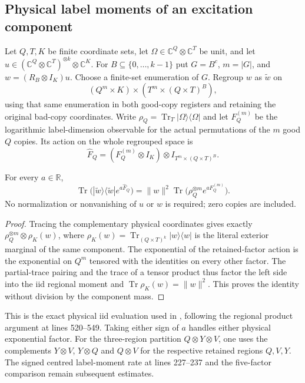 \subsection{Physical label moments of an excitation component}
\label{sec:replica_physical_label_moment}

Let $Q,T,K$ be finite coordinate sets, let $\Omega\in\mathbb C^Q\otimes\mathbb C^T$
be unit, and let $u\in(\mathbb C^Q\otimes\mathbb C^T)^{\otimes k}\otimes\mathbb C^K$.
For $B\subseteq\{0,\ldots,k-1\}$ put $G=B^c$, $m=|G|$, and
$w=(R_B\otimes I_K)u$. Choose a finite-set enumeration of $G$. Regroup $w$ as
$\widetilde w$ on
\[
 (Q^m\times K)\times(T^m\times(Q\times T)^B),
\]
using that same enumeration in both good-copy registers and retaining the
original bad-copy coordinates. Write
$\rho_Q=\operatorname{Tr}_T|\Omega\rangle\langle\Omega|$ and let $F_Q^{(m)}$
be the logarithmic label-dimension observable for the actual permutations of
the $m$ good $Q$ copies. Its action on the whole regrouped space is
\[
 \widehat F_Q=(F_Q^{(m)}\otimes I_K)\otimes I_{T^m\times(Q\times T)^B}.
\]

\begin{theorem}
\label{thm:replica_physical_label_moment}
\leanok
For every $a\in\mathbb R$,
\begin{equation}
 \operatorname{Tr}\bigl(|\widetilde w\rangle\langle\widetilde w|
                       e^{a\widehat F_Q}\bigr)
 =\|w\|^2\operatorname{Tr}\bigl(\rho_Q^{\otimes m}e^{aF_Q^{(m)}}\bigr).
 \label{eq:replica_physical_label_moment}
\end{equation}
No normalization or nonvanishing of $u$ or $w$ is required; zero copies are included.
\end{theorem}

\begin{proof}
\leanok
{}
Tracing the complementary physical coordinates gives exactly
$\rho_Q^{\otimes m}\otimes\rho_K(w)$, where
$\rho_K(w)=\operatorname{Tr}_{(Q\times T)^k}|w\rangle\langle w|$ is the
literal exterior marginal of the same component. The exponential of the
retained-factor action is the exponential on $Q^m$ tensored with the identities
on every other factor. The partial-trace pairing and the trace of a tensor
product thus factor the left side into the iid regional moment and
$\operatorname{Tr}\rho_K(w)=\|w\|^2$. This proves the identity without division
by the component mass.
\end{proof}

This is the exact physical iid evaluation used in
\cite[Section~7, lines 556--560]{OpenAI2026AreaLaw}, following the regional
product argument at lines 520--549. Taking either sign of $a$ handles either
physical exponential factor. For the three-region partition $Q\otimes Y\otimes V$,
one uses the complements $Y\otimes V$, $Y\otimes Q$ and $Q\otimes V$ for the
respective retained regions $Q,V,Y$. The signed centred label-moment rate at
lines 227--237 and the five-factor comparison remain subsequent estimates.
